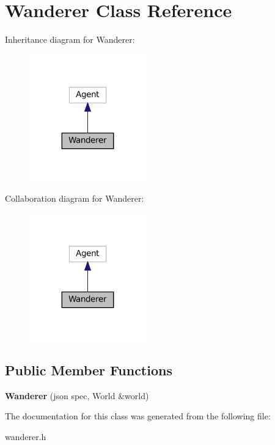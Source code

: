 \hypertarget{classWanderer}{}\section{Wanderer Class Reference}
\label{classWanderer}


Inheritance diagram for Wanderer\+:
\nopagebreak
\begin{figure}[H]
\begin{center}
\leavevmode
\includegraphics[width=143pt]{classWanderer__inherit__graph}
\end{center}
\end{figure}


Collaboration diagram for Wanderer\+:
\nopagebreak
\begin{figure}[H]
\begin{center}
\leavevmode
\includegraphics[width=143pt]{classWanderer__coll__graph}
\end{center}
\end{figure}
\subsection*{Public Member Functions}
\begin{DoxyCompactItemize}
\item 
\mbox{\label{classWanderer_ac1c59ca77b69786ca6717707e5e07344}} 
{\bfseries Wanderer} (json spec, World \&world)
\end{DoxyCompactItemize}


The documentation for this class was generated from the following file\+:\begin{DoxyCompactItemize}
\item 
wanderer.\+h\end{DoxyCompactItemize}
